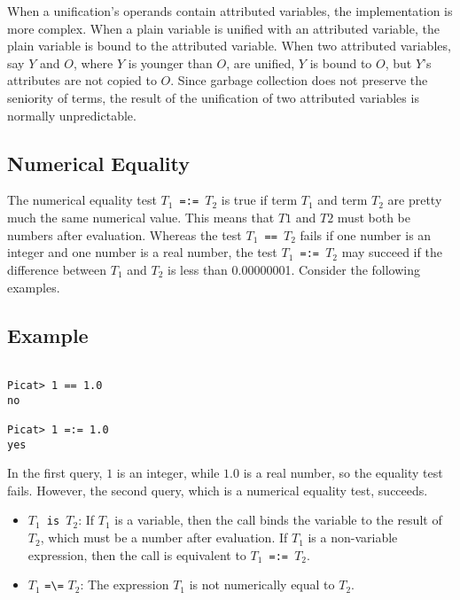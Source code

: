 When a unification's operands contain attributed variables, the implementation is more complex. When a plain variable is unified with an attributed variable, the plain variable is bound to the attributed variable. When two attributed variables, say $Y$ and $O$, where $Y$ is younger than $O$, are unified,  $Y$ is bound to $O$, but $Y$'s attributes are not copied to $O$. Since garbage collection does not preserve the seniority of terms, the result of the unification of two attributed variables is normally unpredictable.

\subsection{Numerical Equality}
The numerical equality test \texttt{$T_1$ =:= $T_2$} is true if term $T_1$ and term $T_2$ are pretty much the same numerical value.  This means that $T1$ and $T2$ must both be numbers after evaluation.  Whereas the test \texttt{$T_1$ == $T_2$} fails if one number is an integer and one number is a real number, the test \texttt{$T_1$ =:= $T_2$} may succeed if the difference between $T_1$ and $T_2$ is less than 0.00000001.  Consider the following examples.
\subsection*{Example}

\begin{verbatim}
    
Picat> 1 == 1.0
no

Picat> 1 =:= 1.0
yes
\end{verbatim}
In the first query, $1$ is an integer, while $1.0$ is a real number, so the equality test fails.  However, the second query, which is a numerical equality test, succeeds.  

\begin{itemize}
\item \texttt{$T_1$ is $T_2$}: If \texttt{$T_1$} is a variable, then the call binds the variable to the result of \texttt{$T_2$}, which must be a number after evaluation. If \texttt{$T_1$} is a non-variable expression, then the call is equivalent to \texttt{$T_1$ =:= $T_2$}.

\item $T_1$ \verb+=\=+ $T_2$: The expression \texttt{$T_1$} is not numerically equal to \texttt{$T_2$}.
\end{itemize}

